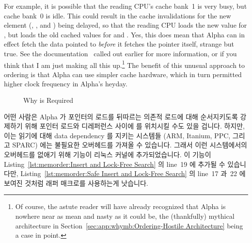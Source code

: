 For example, it is possible that the reading CPU's cache bank~1 is very
busy, but cache bank~0 is idle.
This could result in the cache invalidations for the new element
(, , and ) being
delayed, so that the reading CPU loads the new value for ,
but loads the old cached values for  and .
Yes, this does mean that Alpha can in effect fetch
the data pointed to {\em before} it fetches the pointer itself, strange
but true.
See the documentation~\cite{Compaq01,WilliamPugh2000Gharachorloo}
called out earlier for more information,
or if you think that I am just making all this up.\footnote{
	Of course, the astute reader will have already recognized that
	Alpha is nowhere near as mean and nasty as it could be,
	the (thankfully) mythical architecture in
	Section~\ref{sec:app:whymb:Ordering-Hostile Architecture}
	being a case in point.}
The benefit of this unusual approach to ordering is that Alpha can use
simpler cache hardware, which in turn permitted higher clock frequency
in Alpha's heyday.
\fi

\begin{figure}[tbp]
\centering
{}
\caption{Why  is Required}
\label{fig:memorder:Why smp-read-barrier-depends() is Required}
\end{figure}

어떤 사람은 Alpha 가 포인터의 로드를 뒤따르는 의존적 로드에 대해 순서지키도록
강제하기 위해 포인터 로드와 디레퍼런스 사이에  를 위치시킬 수도
있을 겁니다.
하지만, 이는 읽기에 대해 data dependency 를 지키는 시스템들 (ARM, Itanium, PPC,
그리고 SPARC) 에는 불필요한 오버헤드를 가져올 수 있습니다.
그래서 이런 시스템에서의 오버헤드를 없애기 위해 
기능이 리눅스 커널에 추가되었습니다.
이 기능이
Listing~\ref{lst:memorder:Insert and Lock-Free Search} 의 line~19 에 추가될 수
있습니다만,
Listing~\ref{lst:memorder:Safe Insert and Lock-Free Search} 의 line~17 과~22 에
보여진 것처럼  래퍼 매크로를 사용하는게 낫습니다.
\iffalse

